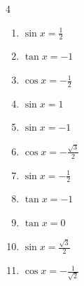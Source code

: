 \begin{multicols}{4}
\begin{enumerate}
  \item $\displaystyle \sin{x}  = \frac{1}{2}$


  \item $\displaystyle \tan{x}  = -1$


  \item $\displaystyle \cos{x}  = -\frac{1}{2}$


\columnbreak %

  \item $\displaystyle \sin{x}  = 1$


  \item $\displaystyle \sin{x}  = -1$


  \item $\displaystyle \cos{x}  = -\frac{\sqrt{3}}{2}$


  \item $\displaystyle \sin{x}  = -\frac{1}{2}$


  \item $\displaystyle \tan{x}  = -1$


  \item $\displaystyle \tan{x}  = 0$

        \phantom{$\displaystyle x = 0 , \pi$}

  \item $\displaystyle \sin{x}  = \frac{\sqrt{3}}{2}$


  \item $\displaystyle \cos{x}  = -\frac{1}{\sqrt{2}}$



\end{enumerate}
\end{multicols}
